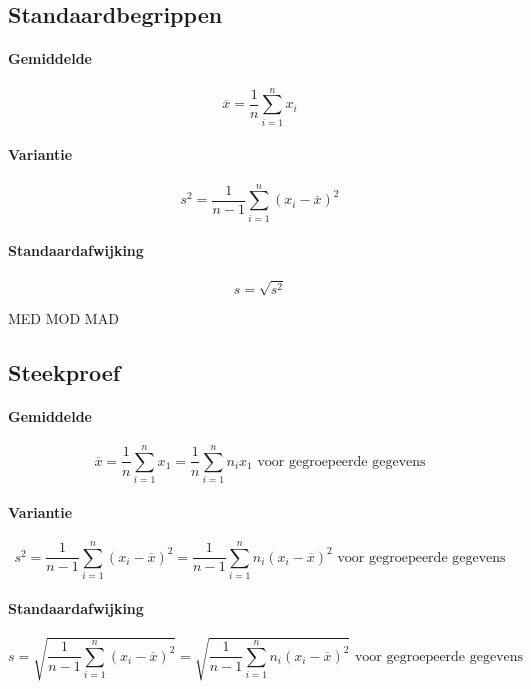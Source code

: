 
\subsection{Standaardbegrippen}
\paragraph{Gemiddelde}
\[
	\overline{x} = \frac{1}{n} \sum^n_{i=1} x_i
\]

\paragraph{Variantie}
\[
	s^2 = \frac{1}{n-1} \sum^n_{i=1} \left(x_i - \overline{x} \right)^2
\]

\paragraph{Standaardafwijking}
\[
  s = \sqrt{s^2}
\]

MED
MOD
MAD


\subsection{Steekproef}
\label{sec:Steekproef}

  \paragraph{Gemiddelde}
  \label{sec:GemiddeldeSteekproef}
  \[
      \overline{x} = \frac{1}{n}\sum^n_{i=1} x_1
                   = \frac{1}{n}\sum^n_{i=1} n_i x_1 \mbox{ voor gegroepeerde gegevens}
  \]

  \paragraph{Variantie}
  \label{sec:VariantieSteekproef}
  \[
      s^2 = \frac{1}{n-1} \sum^n_{i=1} \left(x_i-\overline{x}\right)^2
          = \frac{1}{n-1} \sum^n_{i=1} n_i\left(x_i-\overline{x}\right)^2 \mbox{ voor gegroepeerde gegevens}
  \]

  \paragraph{Standaardafwijking}
  \label{sec:StandaardafwijkingSteekproef}
  \[
      s = \sqrt{\frac{1}{n-1} \sum^n_{i=1} \left(x_i-\overline{x}\right)^2}
        = \sqrt{\frac{1}{n-1} \sum^n_{i=1} n_i\left(x_i-\overline{x}\right)^2} \mbox{ voor gegroepeerde gegevens}
  \]


